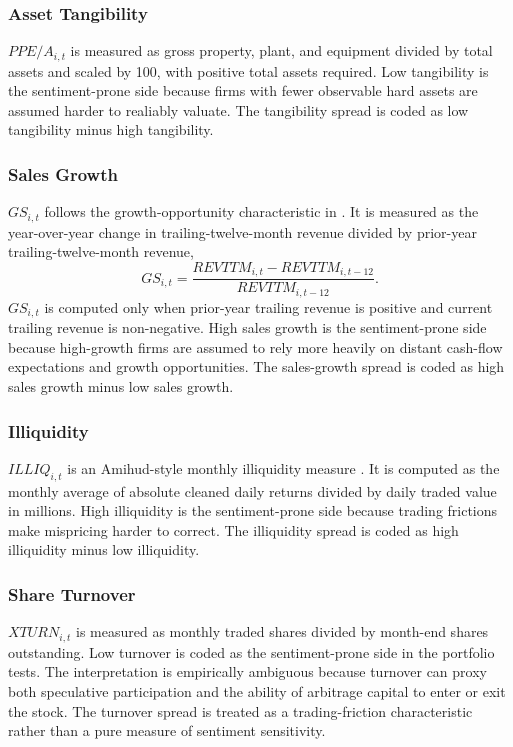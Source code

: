 \documentclass[11pt]{article}
\newcommand{\var}[1]{\ensuremath{#1}}
\begin{document}
\subsubsection{Asset Tangibility}
\var{PPE/A_{i,t}} is measured as gross property, plant, and equipment divided by total assets and scaled by 100, with positive total assets required. Low tangibility is the sentiment-prone side because firms with fewer observable hard assets are assumed harder to realiably valuate. The tangibility spread is coded as low tangibility minus high tangibility.

\subsubsection{Sales Growth}
\var{GS_{i,t}} follows the growth-opportunity characteristic in \citet{baker2006sentiment}. It is measured as the year-over-year change in trailing-twelve-month revenue divided by prior-year trailing-twelve-month revenue,
\begin{equation}
    GS_{i,t}
    =
    \frac{\var{REVTTM}_{i,t} - \var{REVTTM}_{i,t-12}}{\var{REVTTM}_{i,t-12}}.
\end{equation}
\var{GS_{i,t}} is computed only when prior-year trailing revenue is positive and current trailing revenue is non-negative. High sales growth is the sentiment-prone side because high-growth firms are assumed to rely more heavily on distant cash-flow expectations and growth opportunities. The sales-growth spread is coded as high sales growth minus low sales growth.

\subsubsection{Illiquidity}
\var{ILLIQ_{i,t}} is an Amihud-style monthly illiquidity measure \citep{amihud2002illiquidity}. It is computed as the monthly average of absolute cleaned daily returns divided by daily traded value in millions. High illiquidity is the sentiment-prone side because trading frictions make mispricing harder to correct. The illiquidity spread is coded as high illiquidity minus low illiquidity.

\subsubsection{Share Turnover}
\var{XTURN_{i,t}} is measured as monthly traded shares divided by month-end shares outstanding. Low turnover is coded as the sentiment-prone side in the portfolio tests. The interpretation is empirically ambiguous because turnover can proxy both speculative participation and the ability of arbitrage capital to enter or exit the stock. The turnover spread is treated as a trading-friction characteristic rather than a pure measure of sentiment sensitivity.
\end{document}
